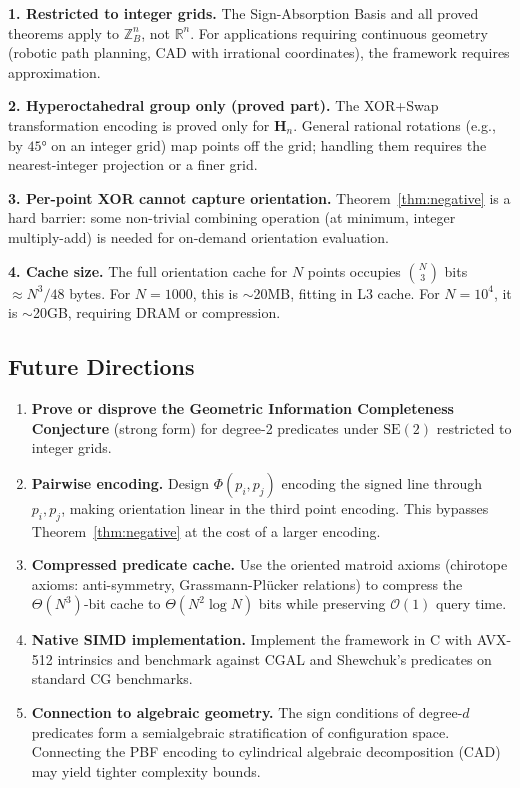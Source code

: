 \documentclass[11pt,letterpaper]{article}
\newcommand{\ZBd}[1]{\mathbb{Z}_B^{#1}}
\newcommand{\RR}{\mathbb{R}}
\newcommand{\Hn}{\mathbf{H}_n}
\newcommand{\cO}{\mathcal{O}}
\begin{document}
\textbf{1. Restricted to integer grids.}  The Sign-Absorption Basis and all proved
theorems apply to $\ZBd{n}$, not $\RR^n$.  For applications requiring continuous
geometry (robotic path planning, CAD with irrational coordinates), the framework
requires approximation.

\textbf{2. Hyperoctahedral group only (proved part).}  The XOR+Swap transformation
encoding is proved only for $\Hn$.  General rational rotations (e.g., by $45°$ on an
integer grid) map points off the grid; handling them requires the nearest-integer
projection or a finer grid.

\textbf{3. Per-point XOR cannot capture orientation.}  Theorem~\ref{thm:negative} is
a hard barrier: some non-trivial combining operation (at minimum, integer multiply-add)
is needed for on-demand orientation evaluation.

\textbf{4. Cache size.}  The full orientation cache for $N$ points occupies
$\binom{N}{3}$ bits $\approx N^3/48$ bytes.  For $N=1000$, this is $\sim$20MB, fitting
in L3 cache.  For $N=10^4$, it is $\sim$20GB, requiring DRAM or compression.

\subsection{Future Directions}

\begin{enumerate}
\item \textbf{Prove or disprove the Geometric Information Completeness Conjecture}
  (strong form) for degree-2 predicates under $\mathrm{SE}(2)$ restricted to integer grids.

\item \textbf{Pairwise encoding.}  Design $\Phi(p_i,p_j)$ encoding the signed line
  through $p_i,p_j$, making orientation linear in the third point encoding.  This
  bypasses Theorem~\ref{thm:negative} at the cost of a larger encoding.

\item \textbf{Compressed predicate cache.}  Use the oriented matroid axioms (chirotope
  axioms: anti-symmetry, Grassmann-Plücker relations) to compress the $\Theta(N^3)$-bit
  cache to $\Theta(N^2\log N)$ bits while preserving $\cO(1)$ query time.

\item \textbf{Native SIMD implementation.}  Implement the framework in C with AVX-512
  intrinsics and benchmark against CGAL and Shewchuk's predicates on standard CG benchmarks.

\item \textbf{Connection to algebraic geometry.}  The sign conditions of degree-$d$
  predicates form a semialgebraic stratification of configuration space.  Connecting
  the PBF encoding to cylindrical algebraic decomposition (CAD)~\cite{Basu06} may yield
  tighter complexity bounds.
\end{enumerate}
\end{document}
